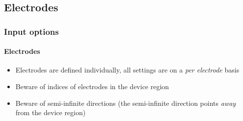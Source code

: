 
\subsection{Electrodes}

\begin{frame}
  \frametitle{Input options}
  \framesubtitle{Electrodes}

  \begin{itemize}
    \item Electrodes are defined individually, all settings are on a \emph{per electrode} basis
    \item Beware of indices of electrodes in the device region
    \item Beware of semi-infinite directions (the semi-infinite direction points
    \emph{away} from the device region)

  \end{itemize}
  
\end{frame}

